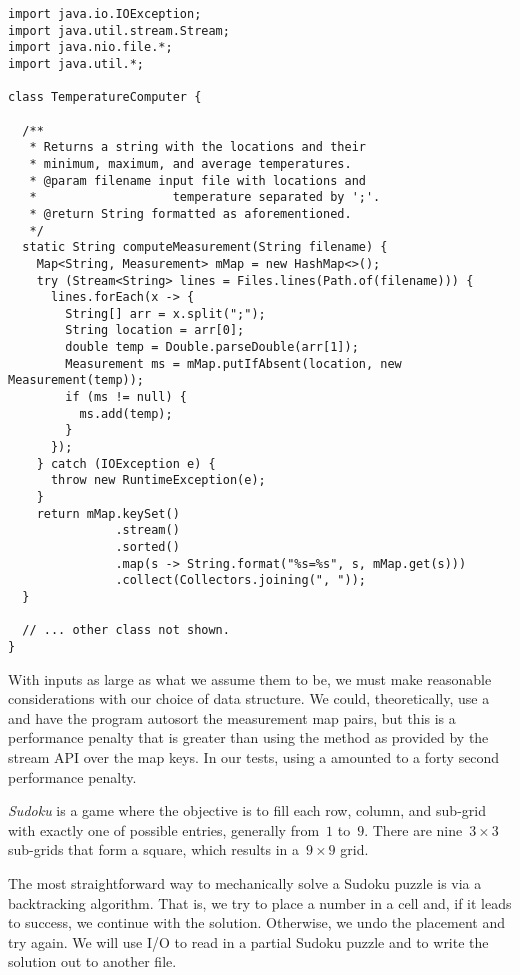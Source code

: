 \begin{lstlisting}[language=MyJava]
import java.io.IOException;
import java.util.stream.Stream;
import java.nio.file.*;
import java.util.*;

class TemperatureComputer {

  /**
   * Returns a string with the locations and their 
   * minimum, maximum, and average temperatures.
   * @param filename input file with locations and 
   *                   temperature separated by ';'.
   * @return String formatted as aforementioned.
   */
  static String computeMeasurement(String filename) {
    Map<String, Measurement> mMap = new HashMap<>();
    try (Stream<String> lines = Files.lines(Path.of(filename))) {
      lines.forEach(x -> {
        String[] arr = x.split(";");
        String location = arr[0];
        double temp = Double.parseDouble(arr[1]);
        Measurement ms = mMap.putIfAbsent(location, new Measurement(temp));
        if (ms != null) { 
          ms.add(temp); 
        }
      });
    } catch (IOException e) {
      throw new RuntimeException(e);
    }
    return mMap.keySet()
               .stream()
               .sorted()
               .map(s -> String.format("%s=%s", s, mMap.get(s)))
               .collect(Collectors.joining(", "));
  }

  // ... other class not shown.
}
\end{lstlisting}

With inputs as large as what we assume them to be, we must make reasonable considerations with our choice of data structure. 
We could, theoretically, use a  and have the program autosort the measurement map pairs, but this is a performance penalty that is greater than using the  method as provided by the stream API over the map keys. 
In our tests, using a  amounted to a forty second performance penalty.

\emph{Sudoku} is a game where the objective is to fill each row, column, and sub-grid with exactly one of possible entries, generally from~$1$ to~$9$. 
There are nine~$3\times{3}$ sub-grids that form a square, which results in a~$9\times{9}$ grid.

The most straightforward way to mechanically solve a Sudoku puzzle is via a backtracking algorithm. 
That is, we try to place a number in a cell and, if it leads to success, we continue with the solution. 
Otherwise, we undo the placement and try again.
We will use I/O to read in a partial Sudoku puzzle and to write the solution out to another file.

